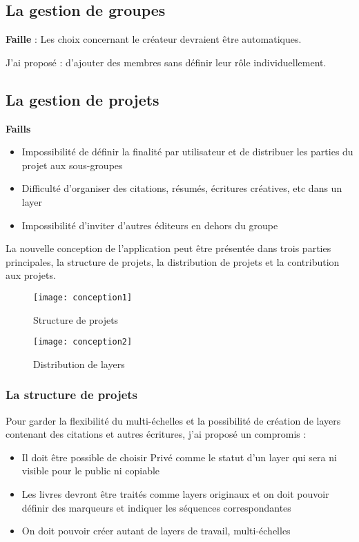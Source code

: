 \subsection{La gestion de groupes}

\textbf{Faille} : Les choix concernant le créateur devraient être automatiques. 

J'ai proposé : d'ajouter des membres sans définir leur rôle individuellement.


\subsection{La gestion de projets}

\textbf{Faills}

\begin{itemize}
    \item Impossibilité de définir la finalité par utilisateur et de distribuer les parties du projet aux sous-groupes
    \item Difficulté d'organiser des citations, résumés, écritures créatives, etc dans un layer
    \item Impossibilité d'inviter d'autres éditeurs en dehors du groupe
\end{itemize}

La nouvelle conception de l'application peut être présentée dans trois parties principales, la structure de projets, la distribution de projets et la contribution aux projets.

\begin{figure}[H]
\centering
\texttt{[image: conception1]}
\caption{Structure de projets}
\end{figure}

\begin{figure}[H]
\centering
\texttt{[image: conception2]}
\caption{Distribution de layers}
\end{figure}

\subsubsection{La structure de projets}

Pour garder la flexibilité du multi-échelles et la possibilité de création de layers contenant des citations et autres écritures, j'ai proposé un compromis :

\begin{itemize}
    \item Il doit être possible de choisir Privé comme le statut d'un layer qui sera ni visible pour le public ni copiable
    \item Les livres devront être traités comme layers originaux et on doit pouvoir définir des marqueurs et indiquer les séquences correspondantes
    \item On doit pouvoir créer autant de layers de travail, multi-échelles 
\end{itemize}

